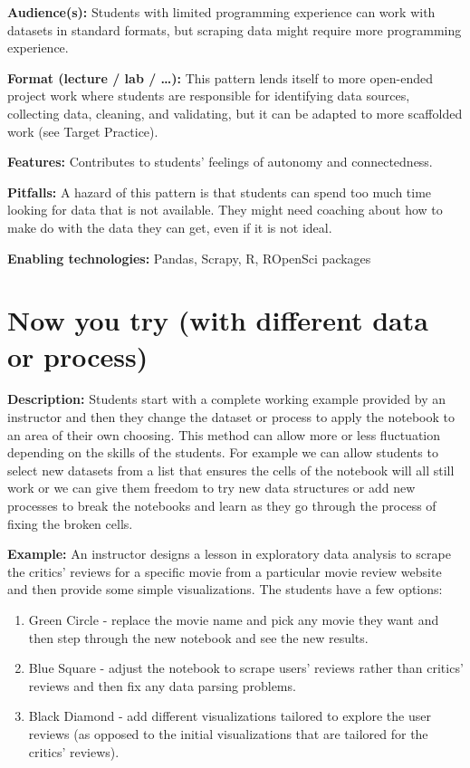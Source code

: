 \documentclass[]{book}
\providecommand{\tightlist}{%
  \setlength{\itemsep}{0pt}\setlength{\parskip}{0pt}}
\begin{document}
\textbf{Audience(s):} Students with limited programming experience can
work with datasets in standard formats, but scraping data might require
more programming experience.

\textbf{Format (lecture / lab / \ldots{}):} This pattern lends itself to
more open-ended project work where students are responsible for
identifying data sources, collecting data, cleaning, and validating, but
it can be adapted to more scaffolded work (see Target Practice).

\textbf{Features:} Contributes to students' feelings of autonomy and
connectedness.

\textbf{Pitfalls:} A hazard of this pattern is that students can spend
too much time looking for data that is not available. They might need
coaching about how to make do with the data they can get, even if it is
not ideal.

\textbf{Enabling technologies:} Pandas, Scrapy, R, ROpenSci packages

\section{Now you try (with different data or
process)}\label{now-you-try-with-different-data-or-process}

\textbf{Description:} Students start with a complete working example
provided by an instructor and then they change the dataset or process to
apply the notebook to an area of their own choosing. This method can
allow more or less fluctuation depending on the skills of the students.
For example we can allow students to select new datasets from a list
that ensures the cells of the notebook will all still work or we can
give them freedom to try new data structures or add new processes to
break the notebooks and learn as they go through the process of fixing
the broken cells.

\textbf{Example:} An instructor designs a lesson in exploratory data
analysis to scrape the critics' reviews for a specific movie from a
particular movie review website and then provide some simple
visualizations. The students have a few options:

\begin{enumerate}
\def\labelenumi{\arabic{enumi}.}
\tightlist
\item
  Green Circle - replace the movie name and pick any movie they want and
  then step through the new notebook and see the new results.
\item
  Blue Square - adjust the notebook to scrape users' reviews rather than
  critics' reviews and then fix any data parsing problems.
\item
  Black Diamond - add different visualizations tailored to explore the
  user reviews (as opposed to the initial visualizations that are
  tailored for the critics' reviews).
\end{enumerate}
\end{document}
